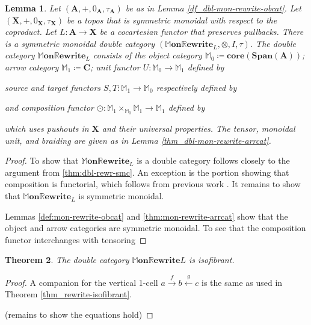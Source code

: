 \documentclass[]{amsart}
\newcommand{\MM}{\mathbb{M}}
\newcommand{\A}{\cat{A}}
\newcommand{\C}{\cat{C}}
\newcommand{\X}{\cat{X}}
\newcommand{\core}{\mathbf{core}}
\newcommand{\cat}[1]{\mathbf{#1}}
\newcommand{\from}{\colon}
\newcommand{\xto}[1]{\xrightarrow{#1}}
\newcommand{\xgets}[1]{\xleftarrow{#1}}
\newcommand{\diagram}[1]{\raisebox{-0.5\height}{\texttt{[image: \#1]}}}
\newcommand{\Span}{\mathbf{Span}}
\newcommand{\MMonRewrite}{ \mathbb{M}\mathbf{on}\mathbb{R}\mathbf{ewrite} }
\newcommand{\edit}[1]{\textcolor{editcolour}{(#1)}}
\newtheorem{theorem}{Theorem}[section]
\newtheorem{lemma}[theorem]{Lemma}
\theoremstyle{remark}
\theoremstyle{definition}
\begin{document}
\begin{lemma} \label{thm:dbl-mon-rewr-smc} 
  Let $ (\A , + , 0_\A , \tau_\A ) $ be as in Lemma
  \ref{df_dbl-mon-rewrite-obcat}. Let $ (\X , + , 0_\X , \tau_\X ) $
  be a topos that is symmetric monoidal with respect to the
  coproduct. Let $ L \from \A \to \X $ be a cocartesian functor that
  preserves pullbacks.  There is a symmetric monoidal double category
  $ (\MMonRewrite_{L} , \otimes , I , \tau) $. The double category
  $ \MMonRewrite_{L} $ consists of the object category
  $ \MM_0 \coloneqq \core (\Span (\A)) $; arrow category
  $ \MM_1 \coloneqq \C $; unit functor $ U \from \MM_0 \to \MM_1 $
  defined by
  \begin{center}
    \diagram{diag_lr_dbl-mon-rewrite-unit-functor}
  \end{center}
  source and target functors $ S , T \from \MM_1 \to \MM_0 $
  respectively defined by
  \begin{center}
    \diagram{diag_lr_dbl-mon-rewrite-source-functor} \quad
     \quad
    \diagram{diag_lr_dbl-mon-rewrite-target-functor}
  \end{center}
  and composition functor
  $ \odot \from \MM_1 \times_{\MM_0} \MM_1 \to \MM_1 $ defined
  by
  \begin{center}
    \diagram{diag_lr_dbl-mon-rewrite-composition-functor}
  \end{center}
  which uses pushouts in $ \X $ and their universal properties.
  The tensor, monoidal unit, and braiding are given as in Lemma
  \ref{thm_dbl-mon-rewrite-arrcat}.
\end{lemma}

\begin{proof}
  
  To show that $\MMonRewrite_L$ is a double category follows closely
  to the argument from \ref{thm:dbl-rewr-smc}. An exception is the
  portion showing that composition is functorial, which follows from
  previous work \cite[Lemma 4.4]{sp-csp-top}. It remains to show that
  $\MMonRewrite_L$ is symmetric monoidal.

  Lemmas \ref{def:mon-rewrite-obcat} and \ref{thm:mon-rewrite-arrcat}
  show that the object and arrow categories are symmetric monoidal. To
  see that the composition functor interchanges with tensoring   
  
  
\end{proof}

\begin{theorem} \label{thm_dbl-mon-rewrite_isIsofib}
  The double category $ \MMonRewrite{L} $ is isofibrant.
\end{theorem}
\begin{proof}
  A companion for the vertical 1-cell $ a \xto{f} b \xgets{g} c $ is
  the same as used in Theorem \ref{thm_rewrite-isofibrant}.
	
	\edit{remains to show the equations hold}
\end{proof}
\end{document}
